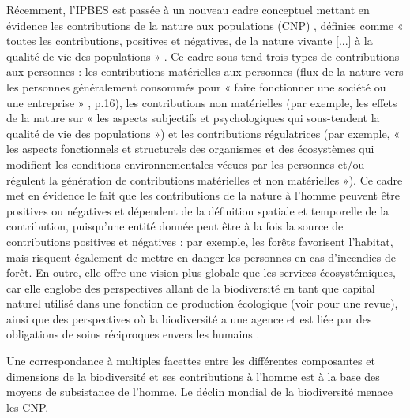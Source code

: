 Récemment, l'IPBES est passée à un nouveau cadre conceptuel mettant en évidence les contributions de la nature aux populations (CNP) \citep{DIAZ20151}, définies comme « toutes les contributions, positives et négatives, de la nature vivante [...] à la qualité de vie des populations » \citep{diaz_2018}. Ce cadre sous-tend trois types de contributions aux personnes : les contributions matérielles aux personnes (flux de la nature vers les personnes généralement consommés pour « faire fonctionner une société ou une entreprise » \cite{ipbes_2022_6417333}, p.16), les contributions non matérielles (par exemple, les effets de la nature sur « les aspects subjectifs et psychologiques qui sous-tendent la qualité de vie des populations ») et les contributions régulatrices (par exemple, « les aspects fonctionnels et structurels des organismes et des écosystèmes qui modifient les conditions environnementales vécues par les personnes et/ou régulent la génération de contributions matérielles et non matérielles »). Ce cadre met en évidence le fait que les contributions de la nature à l'homme peuvent être positives ou négatives et dépendent de la définition spatiale et temporelle de la contribution, puisqu'une entité donnée peut être à la fois la source de contributions positives et négatives : par exemple, les forêts favorisent l'habitat, mais risquent également de mettre en danger les personnes en cas d'incendies de forêt. En outre, elle offre une vision plus globale que les services écosystémiques, car elle englobe des perspectives allant de la biodiversité en tant que capital naturel utilisé dans une fonction de production écologique (voir \cite{polasky_integrating_2009} pour une revue), ainsi que des perspectives où la biodiversité a une agence et est liée par des obligations de soins réciproques envers les humains \citep{descola}. 

Une correspondance à multiples facettes entre les différentes composantes et dimensions de la biodiversité et ses contributions à l'homme est à la base des moyens de subsistance de l'homme. Le déclin mondial de la biodiversité menace les CNP.

